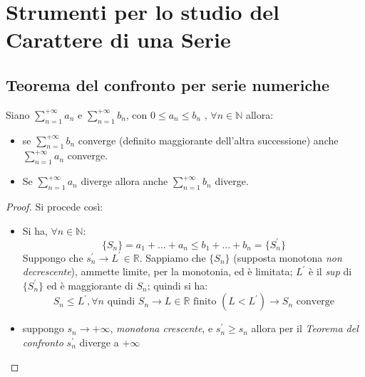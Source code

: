 \documentclass[a4paper,12pt, oneside]{book}
\begin{document}
\section{Strumenti per lo studio del Carattere di una Serie}
\subsection{Teorema del confronto per serie numeriche}
\begin{teorema}
Siano $\sum_{n=1}^{+\infty} a_n$ e $\sum_{n=1}^{+\infty} b_n$, con $0\leq a_n\leq b_n \mbox{ , } \forall n\in \mathbb{N}$ allora:
\begin{itemize}
\item se  $\sum_{n=1}^{+\infty} b_n$ converge (definito maggiorante dell'altra successione) anche $\sum_{n=1}^{+\infty} a_n$ converge.
\item Se $\sum_{n=1}^{+\infty} a_n$ diverge allora anche $\sum_{n=1}^{+\infty} b_n$ diverge.
\end{itemize}
\end{teorema}
\begin{proof}
Si procede così:
\begin{itemize}
\item Si ha, $\forall n\in \mathbb{N}$:
$$\{S_n\}=a_1+...+a_n\leq b_1+...+b_n=\{S^{'}_n\}$$
Suppongo che $s^{'}_n\rightarrow L^{'} \in \mathbb{R}$. Sappiamo che $\{S_n\}$ (supposta monotona \textit{non decrescente}), ammette limite, per la monotonia, ed è limitata; $L^{'}$ è il \textit{sup} di $\{S^{'}_n\}$ ed è maggiorante di $S_n$; quindi si ha:
$$S_n\leq L^{'}, \forall n\mbox{  quindi  } S_n\rightarrow L\in \mathbb{R}\mbox{  finito  } (L<L^{'}) \longrightarrow S_n \mbox{ converge}$$
\item suppongo $s_n\rightarrow +\infty$, \textit{monotona crescente}, e $s^{'}_n\geq s_n$ allora per il \textit{Teorema del confronto} $s^{'}_n$ diverge a $+\infty$
\end{itemize}
\end{proof}
\end{document}
